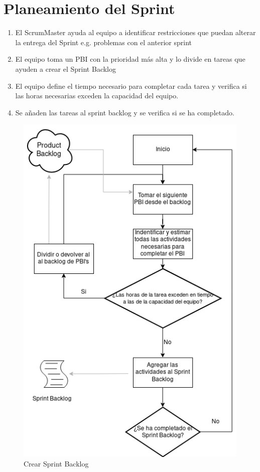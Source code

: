 \documentclass[letterpaper]{scrreprt}
\begin{document}
\section{Planeamiento del Sprint}
\begin{enumerate}
	\item El ScrumMaster ayuda al equipo a identificar restricciones que puedan alterar la entrega del Sprint e.g. problemas con el anterior sprint
	\item El equipo toma un PBI con la prioridad más alta y lo divide en tareas que ayuden a crear el Sprint Backlog
	\item El equipo define el tiempo necesario para completar cada tarea y verifica si las horas necesarias exceden la capacidad del equipo.
	\item Se añaden las tareas al sprint backlog y se verifica si se ha completado.
\end{enumerate}

\begin{figure}
[h]
	\includegraphics[scale=0.7]{sprintbl.png}
	\centering
	\caption{\label{fig:sprintbacklog} Crear Sprint Backlog}
\end{figure}
\end{document}
